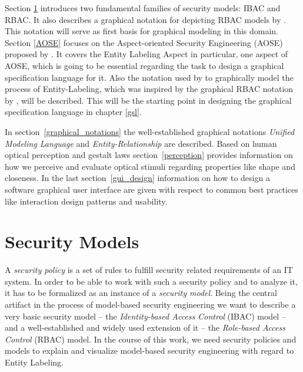 \documentclass[twoside, openright, 12pt]{book}
\begin{document}
Section \ref{security_models} introduces two fundamental families of security models: IBAC and RBAC.
It also describes a graphical notation for depicting RBAC models by \cite{Sandhu96}.
This notation will serve as first basis for graphical modeling in this domain.
Section \ref{AOSE} focuses on the Aspect-oriented Security Engineering (AOSE) proposed by \citet*{Amthor18}.
It covers the Entity Labeling Aspect in particular, one aspect of AOSE, which is going to be essential regarding the task to design a graphical specification language for it.
Also the notation used by \citet*{Amthor18} to graphically model the process of Entity-Labeling, which was inspired by the graphical RBAC notation by \cite{Sandhu96}, will be described.
This will be the starting point in designing the graphical specification language in chapter \ref{gsl}.

In section~\ref{graphical_notations} the well-established graphical notations \textit{Unified Modeling Language} and \textit{Entity-Relationship} are described.
Based on human optical perception and gestalt laws section~\ref{perception} provides information on how we perceive and evaluate optical stimuli regarding properties like shape and closeness.
In the last section~\ref{gui_design} information on how to design a software graphical user interface are given with respect to common best practices like interaction design patterns and usability.

\section{Security Models}
\label{security_models}
A \textit{security policy} is a set of rules to fulfill security related requirements of an IT system.
In order to be able to work with such a security policy and to analyze it, it has to be formalized as an instance of a \textit{security model}.
Being the central artifact in the process of model-based security engineering we want to describe a very basic security model -- the \textit{Identity-based Access Control} (IBAC) model -- and a well-established and widely used extension of it -- the \textit{Role-based Access Control} (RBAC) model.
In the course of this work, we need security policies and models to explain and visualize model-based security engineering with regard to Entity Labeling.

\end{document}
